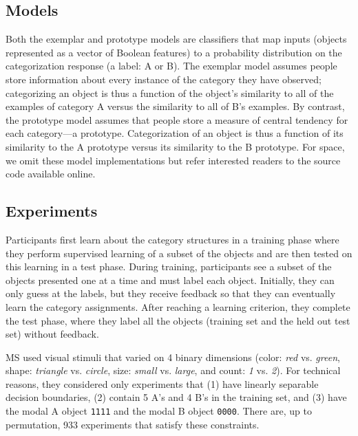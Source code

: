 \documentclass[10pt,letterpaper]{article}
\begin{document}



\subsection{Models}

Both the exemplar and prototype models are classifiers that map inputs (objects represented as a vector of Boolean features) to a probability distribution on the categorization response (a label: A or B).
The exemplar model assumes people store information about every instance of the category they have observed; categorizing an object is thus a function of the object's similarity to all of the examples of category A versus the similarity to all of B's examples.
By contrast, the prototype model assumes that people store a measure of central tendency for each category---a prototype.
Categorization of an object is thus a function of its similarity to the A prototype versus its similarity to the B prototype.
For space, we omit these model implementations but refer interested readers to the source code available online.

\subsection{Experiments}

Participants first learn about the category structures in a training phase where they perform supervised learning of a subset of the objects and are then tested on this learning in a test phase.
During training, participants see a subset of the objects presented one at a time and must label each object.
Initially, they can only guess at the labels, but they receive feedback so that they can eventually learn the category assignments.
After reaching a learning criterion, they complete the test phase, where they label all the objects (training set and the held out test set) without feedback.

MS used visual stimuli that varied on 4 binary dimensions (color: \emph{red} vs. \emph{green}, shape: \emph{triangle} vs. \emph{circle}, size: \emph{small} vs. \emph{large}, and count: \emph{1} vs. \emph{2}).
For technical reasons, they considered only experiments that (1) have linearly separable decision boundaries, (2) contain 5 A's and 4 B's in the training set, and (3) have the modal A object \lstinline{1111} and the modal B object \lstinline{0000}.
There are, up to permutation, 933 experiments that satisfy these constraints.
\end{document}
